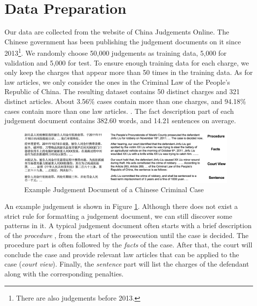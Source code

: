\section{Data Preparation} 
Our data are collected from the website of China Judgements Online. The Chinese government has been publishing the judgement documents on it since 2013\footnote{There are also judgements before 2013.}. We randomly choose 50,000 judgements as training data, 5,000 for validation and 5,000 for test. To ensure enough training data for each charge, we only keep the charges that appear more than 50 times in the training data. As for law articles, we only consider the ones in the Criminal Law of the People's Republic of China. The resulting dataset contains 50 distinct charges and 321 distinct articles. About 3.56\% cases contain more than one charges, and 94.18\% cases contain more than one law articles. . The fact description part of each judgement document contains 382.60 words, and 14.21 sentences on average.

\begin{figure}[t!]
\begin{center}
\includegraphics[width=0.97\textwidth]{figures/case.png}	
\caption{Example Judgement Document of a Chinese Criminal Case}
\label{fig_example_case}
\end{center}
\end{figure}

An example judgement is shown in Figure \ref{fig_example_case}. Although there does not exist a strict rule for formatting a judgement document, we can still discover some patterns in it. A typical judgement document often starts with a brief description of the \emph{procedure} , from the start of the prosecution until the case is decided. The procedure part is often followed by the \emph{facts} of the case. After that, the court will conclude the case and provide relevant law articles that can be applied to the case (\emph{court view}). Finally, the \emph{sentence} part will list the charges of the defendant along with the corresponding penalties. 

